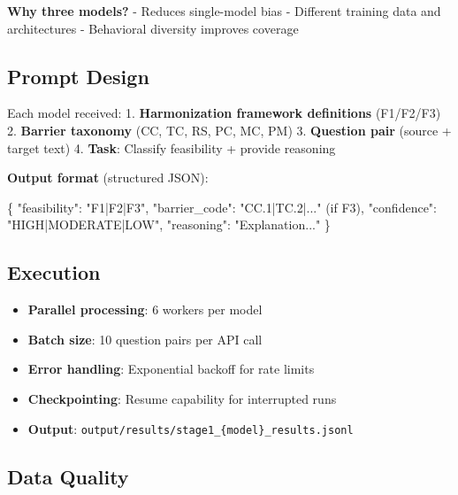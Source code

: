 \documentclass[
  letterpaper,
]{report}
\newenvironment{Shaded}{\begin{snugshade}}{\end{snugshade}}
\newcommand{\DataTypeTok}[1]{\textcolor[rgb]{0.68,0.00,0.00}{#1}}
\newcommand{\ErrorTok}[1]{\textcolor[rgb]{0.68,0.00,0.00}{#1}}
\newcommand{\FunctionTok}[1]{\textcolor[rgb]{0.28,0.35,0.67}{#1}}
\newcommand{\StringTok}[1]{\textcolor[rgb]{0.13,0.47,0.30}{#1}}
\providecommand{\tightlist}{%
  \setlength{\itemsep}{0pt}\setlength{\parskip}{0pt}}
\begin{document}
\textbf{Why three models?} - Reduces single-model bias - Different
training data and architectures - Behavioral diversity improves coverage

\subsection{Prompt Design}\label{prompt-design}

Each model received: 1. \textbf{Harmonization framework definitions}
(F1/F2/F3) 2. \textbf{Barrier taxonomy} (CC, TC, RS, PC, MC, PM) 3.
\textbf{Question pair} (source + target text) 4. \textbf{Task}: Classify
feasibility + provide reasoning

\textbf{Output format} (structured JSON):

\begin{Shaded}
\begin{Highlighting}[]
\FunctionTok{\{}
  \DataTypeTok{"feasibility"}\FunctionTok{:} \StringTok{"F1|F2|F3"}\FunctionTok{,}
  \DataTypeTok{"barrier\_code"}\FunctionTok{:} \StringTok{"CC.1|TC.2|..."} \ErrorTok{(if} \ErrorTok{F3)}\FunctionTok{,}
  \DataTypeTok{"confidence"}\FunctionTok{:} \StringTok{"HIGH|MODERATE|LOW"}\FunctionTok{,}
  \DataTypeTok{"reasoning"}\FunctionTok{:} \StringTok{"Explanation..."}
\FunctionTok{\}}
\end{Highlighting}
\end{Shaded}

\subsection{Execution}\label{execution}

\begin{itemize}
\tightlist
\item
  \textbf{Parallel processing}: 6 workers per model
\item
  \textbf{Batch size}: 10 question pairs per API call
\item
  \textbf{Error handling}: Exponential backoff for rate limits
\item
  \textbf{Checkpointing}: Resume capability for interrupted runs
\item
  \textbf{Output}:
  \texttt{output/results/stage1\_\{model\}\_results.jsonl}
\end{itemize}

\subsection{Data Quality}\label{data-quality}
\end{document}
